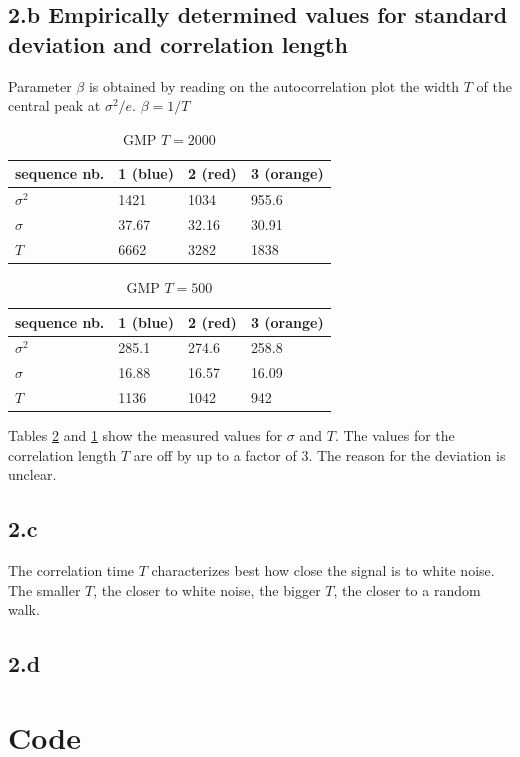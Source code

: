 \documentclass{article}
\begin{document}
\subsection*{2.b Empirically determined values for standard deviation and correlation length}

Parameter $\beta$ is obtained by reading on the autocorrelation plot the width $T$ of the central peak at $\sigma^2/e$. $\beta = 1/T$

\begin{table}[h]
\centering
\begin{tabular}{llll}
sequence nb. & 1 (blue) & 2 (red) & 3 (orange) \\ \hline
$\sigma^2$ &  1421 & 1034 & 955.6  \\
$\sigma$ &  37.67 & 32.16 & 30.91  \\
$T$ & 6662 & 3282 & 1838
\end{tabular}
\caption{GMP $T=2000$}
\label{tab:gmp2000}
\end{table}

\begin{table}[h]
\centering
\begin{tabular}{llll}
sequence nb. & 1 (blue) & 2 (red) & 3 (orange) \\ \hline
$\sigma^2$ &  285.1 & 274.6 & 258.8  \\
$\sigma$ &  16.88 & 16.57 & 16.09  \\
$T$ & 1136 & 1042 & 942
\end{tabular}
\caption{GMP $T=500$}
\label{tab:gmp500}
\end{table}

Tables \ref{tab:gmp500} and \ref{tab:gmp2000} show the measured values for $\sigma$ and $T$.
The values for the correlation length $T$ are off by up to a factor of 3. The reason for the deviation is unclear.

\subsection*{2.c}
The correlation time $T$ characterizes best how close the signal is to white noise.
The smaller $T$, the closer to white noise, the bigger $T$, the closer to a random walk.

\subsection*{2.d}


\newpage
\section*{Code}

\end{document}
